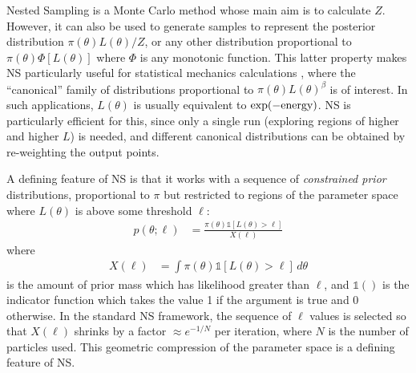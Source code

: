 \documentclass[article, nojss]{jss}
\begin{document}
Nested Sampling \citep[NS;][]{skilling2006nested} is a Monte Carlo method whose main
aim is to calculate $Z$. However, it can also be used to generate samples
to represent the posterior distribution $\pi(\theta)L(\theta)/Z$, or
any other distribution proportional to
$\pi(\theta)\Phi\left[L(\theta)\right]$ where $\Phi$ is any monotonic function.
This latter property makes NS particularly useful for statistical mechanics
calculations \citep{partay2010efficient, baldock2016determining},
where the
``canonical'' family of distributions proportional to
$\pi(\theta)L(\theta)^\beta$ is of interest. In such applications,
$L(\theta)$ is usually equivalent to
$\exp(-\textnormal{energy})$. NS is particularly efficient for this, since
only a single run (exploring regions of higher and higher $L$) is needed, and different canonical
distributions can be obtained by re-weighting the output points.

A defining feature of NS is that it works with a sequence of
{\em constrained prior} distributions, proportional to $\pi$ but
restricted to regions of the parameter space where $L(\theta)$
is above some threshold $\ell$:
\begin{align}
p(\theta; \ell) &=
\frac{\pi(\theta)\mathds{1}\left[L(\theta) > \ell\right]}{X(\ell)}
\label{eqn:constrained_prior}
\end{align}
where
\begin{align}
X(\ell) &= \int \pi(\theta) \mathds{1}\left[L(\theta) > \ell\right] \, d\theta
\end{align}
is the amount of prior mass which has likelihood greater than $\ell$, and
$\mathds{1}()$ is the indicator function which takes the value 1 if the
argument is true and 0 otherwise.
In the standard NS framework, the sequence of $\ell$ values is selected
so that $X(\ell)$ shrinks by a factor $\approx e^{-1/N}$ per iteration, where
$N$ is the number of particles used. This geometric compression of the
parameter space is a defining feature of NS.
\end{document}

